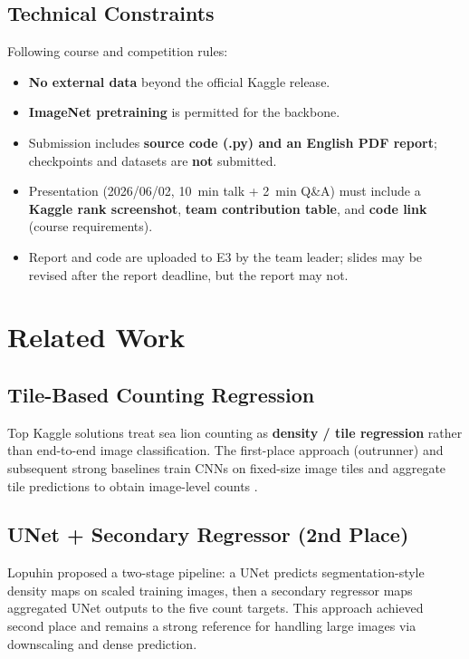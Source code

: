 \documentclass[12pt, a4paper]{article}
\begin{document}
\subsection{Technical Constraints}
Following course and competition rules:
\begin{itemize}
    \item \textbf{No external data} beyond the official Kaggle release.
    \item \textbf{ImageNet pretraining} is permitted for the backbone.
    \item Submission includes \textbf{source code (.py) and an English PDF report}; checkpoints and datasets are \textbf{not} submitted.
    \item Presentation (2026/06/02, 10~min talk + 2~min Q\&A) must include a \textbf{Kaggle rank screenshot}, \textbf{team contribution table}, and \textbf{code link} (course requirements).
    \item Report and code are uploaded to E3 by the team leader; slides may be revised after the report deadline, but the report may not.
\end{itemize}

\section{Related Work}

\subsection{Tile-Based Counting Regression}
Top Kaggle solutions treat sea lion counting as \textbf{density / tile regression} rather than end-to-end image classification. The first-place approach (outrunner) and subsequent strong baselines train CNNs on fixed-size image tiles and aggregate tile predictions to obtain image-level counts \cite{outrunner2017}.

\subsection{UNet + Secondary Regressor (2nd Place)}
Lopuhin \cite{lopuhin2017} proposed a two-stage pipeline: a UNet predicts segmentation-style density maps on scaled training images, then a secondary regressor maps aggregated UNet outputs to the five count targets. This approach achieved second place and remains a strong reference for handling large images via downscaling and dense prediction.
\end{document}
